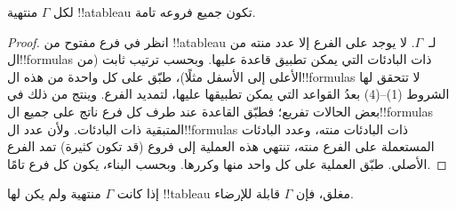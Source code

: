 \documentclass[../../../include/open-logic-section]{subfiles}
\begin{document}
\begin{prop}
  لكل $\Gamma$ منتهية !!a{tableau} تكون جميع فروعه تامة.
\end{prop}

\begin{proof}
  انظر في فرع مفتوح من !!a{tableau} لـ~$\Gamma$. لا يوجد على الفرع
  إلا عدد منته من ال!!{formula}s ذات البادئات التي يمكن تطبيق قاعدة
  عليها. وبحسب ترتيب ثابت (من الأعلى إلى الأسفل مثلًا)، طبّق على كل
  واحدة من هذه ال!!{formula}s لا تتحقق لها الشروط (1)--(4) بعدُ
  القواعد التي يمكن تطبيقها عليها، لتمديد الفرع. وينتج من ذلك في بعض
  الحالات تفريع؛ فطبّق القاعدة عند طرف كل فرع ناتج على جميع
  ال!!{formula}s المتبقية ذات البادئات. ولأن عدد ال!!{formula}s ذات
  البادئات منته، وعدد البادئات المستعملة على الفرع منته، تنتهي هذه
  العملية إلى فروع (قد تكون كثيرة) تمد الفرع الأصلي. طبّق العملية على
  كل واحد منها وكررها. وبحسب البناء، يكون كل فرع تامًا.
\end{proof}

\begin{thm}[التمام]
  إذا كانت $\Gamma$ منتهية ولم يكن لها !!{tableau} مغلق، فإن $\Gamma$
  قابلة للإرضاء.
\end{thm}
\end{document}
